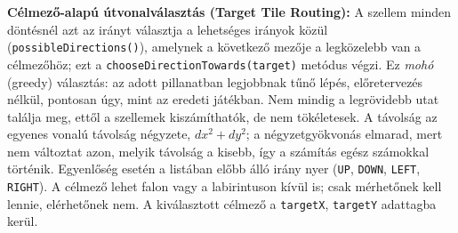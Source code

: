 \documentclass[11pt, a4paper]{article}
\begin{document}
\textbf{Célmező-alapú útvonalválasztás (Target Tile Routing):} A szellem minden döntésnél azt az irányt választja a lehetséges irányok közül (\texttt{possibleDirections()}), amelynek a következő mezője a legközelebb van a célmezőhöz; ezt a \texttt{chooseDirectionTowards(target)} metódus végzi. Ez \textit{mohó} (greedy) választás: az adott pillanatban legjobbnak tűnő lépés, előretervezés nélkül, pontosan úgy, mint az eredeti játékban. Nem mindig a legrövidebb utat találja meg, ettől a szellemek kiszámíthatók, de nem tökéletesek. A távolság az egyenes vonalú távolság négyzete, $dx^2 + dy^2$; a négyzetgyökvonás elmarad, mert nem változtat azon, melyik távolság a kisebb, így a számítás egész számokkal történik. Egyenlőség esetén a listában előbb álló irány nyer (\texttt{UP}, \texttt{DOWN}, \texttt{LEFT}, \texttt{RIGHT}). A célmező lehet falon vagy a labirintuson kívül is; csak mérhetőnek kell lennie, elérhetőnek nem. A kiválasztott célmező a \texttt{targetX}, \texttt{targetY} adattagba kerül.
\end{document}
